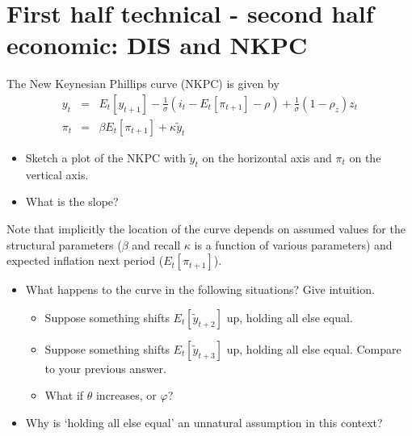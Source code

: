 \documentclass[authoryear,11pt]{elsarticle}
\begin{document}
%

\section{First half technical - second half economic: DIS and NKPC}
The New Keynesian Phillips curve (NKPC) is given by
\begin{eqnarray*}
y_{t} &=& E_{t}[y_{t+1}] - \frac{1}{\sigma}(i_{t} - E_{t}[\pi_{t+1}] - \rho) + \frac{1}{\sigma}(1-\rho_{z})z_{t} \\
\pi_{t} &=& \beta E_{t}[ \pi_{t+1} ] + \kappa \tilde{y}_{t}
\end{eqnarray*}

\begin{itemize}
\item	Sketch a plot of the NKPC with $\tilde{y}_{t}$ on the horizontal axis and $\pi_{t}$ on the vertical axis.
\item	What is the slope?
\end{itemize}
Note that implicitly the location of the curve depends on assumed values for the structural parameters ($\beta$ and recall $\kappa$ is a function of various parameters) and expected inflation next period ($E_{t}[\pi_{t+1}]$).
\begin{itemize}
\item	What happens to the curve in the following situations? Give intuition.
	\begin{itemize}
	\item	Suppose something shifts $E_{t}[\tilde{y}_{t+2}]$ up, holding all else equal.
	\item	Suppose something shifts $E_{t}[\tilde{y}_{t+3}]$ up, holding all else equal. Compare to your previous answer.
	\item	What if $\theta$ increases, or $\varphi$?
	\end{itemize}
\item	Why is `holding all else equal' an unnatural assumption in this context?
\end{itemize}
\end{document}
